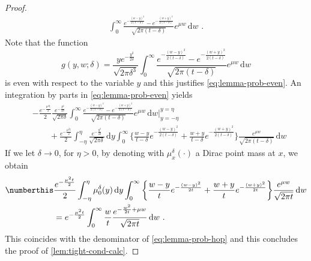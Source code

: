 \begin{proof}
\begin{align*}
	\int_0^\infty 
	\frac{ e^{- \frac{ ( w - y)^2}{2(t-\delta )}} 
		- e^{   - \frac{ (w+y)^2}{2 ( t-\delta)}   } } {\sqrt{2 \pi (t - \delta)}}
	e^{ \mu w } \, \mathrm d w \,\, .
	\end{align*}
	Note that the function 
	\begin{equation*}
	g(y,w ; \delta )  = \frac{ y e^{ - \frac{ y^2}{2 \delta }}}{\sqrt{2 \pi \delta^3}} 
	\int_0^\infty 
	\frac{ e^{- \frac{ ( w - y)^2}{2(t-\delta )}} 
		- e^{   - \frac{ (w+y)^2}{2 ( t-\delta)}   } } {\sqrt{2 \pi (t - \delta)}}
	e^{ \mu w }\, \mathrm d w
	\end{equation*}
	is even with respect to the variable $ y $ and this justifies \eqref{eq:lemma-prob-even}.
	An integration by parts in \eqref{eq:lemma-prob-even} yields
	\begin{align*}
	&
	-\frac{ 
		e^{ - \frac{\mu^2 t}{2}}
	}{2} 
	\frac{ e^{ - \frac{ y^2}{2 \delta }}}{\sqrt{2 \pi \delta}} 
	\int_0^\infty 
	\frac{ e^{- \frac{ ( w - y)^2}{2(t-\delta )}} 
		- e^{   - \frac{ (w+y)^2}{2 ( t-\delta)}   } } {\sqrt{2 \pi (t - \delta)}}
	e^{ \mu w } \, \mathrm d w \Big| _{y = - \eta} ^ { y = \eta} 
	\\
	& \qquad 
	+
	\frac{ 
		e^{ - \frac{\mu^2 t}{2}}
	}{2} 
	\int_{- \eta} ^ \eta 
	\frac{ e^{ - \frac{ y^2}{2 \delta }}}{\sqrt{2 \pi \delta}} \, \mathrm d y
	\int_0^\infty 
	\bigg\{ 
	\frac{w - y }{t - \delta}
	e^{- \frac{ ( w - y)^2}{2(t-\delta )}}
	+ 
	\frac{w + y }{t - \delta}
	e^{   - \frac{ (w+y)^2}{2 ( t-\delta)}   } 
	\bigg \}
	\frac{ e^{ \mu w }} {\sqrt{2 \pi (t - \delta)}}
	\, \mathrm d w
	\end{align*}
	If we let $  \delta \to 0 $, for $  \eta>0 $, by denoting with $ \mu^\delta_x(\cdot) $ a Dirac point mass at $ x $,  we obtain
	\begin{align*}
	\numberthis 
	&  
	\frac{ 
		e^{ - \frac{\mu^2 t}{2}}
	}{2} 
	\int_{- \eta} ^ \eta 
	\mu^\delta_0(y) \, \mathrm d y
	\int_0^\infty 
	\bigg\{ 
	\frac{w - y }{t }
	e^{- \frac{ ( w - y)^2}{2 t}}
	+ 
	\frac{w + y }{t }
	e^{   - \frac{ (w+y)^2}{2  t }   } 
	\bigg \}
	\frac{ e^{ \mu w }} {\sqrt{2 \pi t }}
	\, \mathrm d w
	\\
	&=
	e^{ - \frac{\mu^2 t}{2}}
	\int_0^\infty 
	\frac{w  }{t }
	\frac{ e^{- \frac{ w^2}{2 t}  + \mu w}    } {\sqrt{2 \pi t }}
	\, \mathrm d w \,\, .
	\end{align*}
	This coincides with the denominator of \eqref{eq:lemma-prob-hop}
	and this concludes the proof of \cref{lem:tight-cond-calc}.
\end{proof}
%
%
%
%


